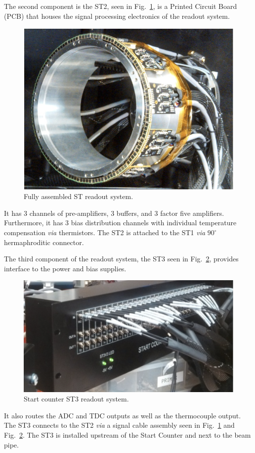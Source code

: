 The second component is the ST2, seen in Fig.~\ref{fig:stfullreadout}, is a Printed Circuit Board (PCB) that houses the signal processing electronics of the readout system.  
\begin{figure}[!htb]
	\centering
	\includegraphics[width=1.0\columnwidth]{design/figs/st_full_readout}
	\caption{Fully assembled ST readout system.}
	\label{fig:stfullreadout}
\end{figure}
It has 3 channels of pre-amplifiers, 3 buffers, and 3 factor five amplifiers.  Furthermore, it has 3 bias distribution channels with individual temperature compensation \emph{via} thermistors.  The ST2 is attached to the ST1 \emph{via} $90^{\circ}$ hermaphroditic connector.  

The third component of the readout system, the ST3 seen in Fig.~\ref{fig:st3}, provides interface to the power and bias supplies.
\begin{figure}[!htb]
	\centering
	\includegraphics[width=1.0\columnwidth]{design/figs/st3}
	\caption{Start counter ST3 readout system.}
	\label{fig:st3}
\end{figure}
It also routes the ADC and TDC outputs as well as the thermocouple output.  The ST3 connects to the ST2 \emph{via} a signal cable assembly seen in Fig.~\ref{fig:stfullreadout} and Fig.~\ref{fig:st3}.  The ST3 is installed upstream of the Start Counter and next to the beam pipe.

